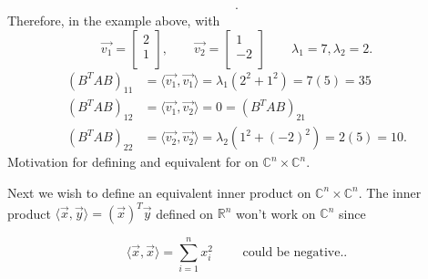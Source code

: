 \documentclass{report}
\begin{document}
{\begin{align*}
  .\end{align*}
  Therefore, in the example above, with 
  \[
  \vec{ v_1} = \begin{bmatrix}
   2\\
  1\\
  \end{bmatrix}
  , \qquad  \vec{ v_2} = \begin{bmatrix}
  1\\
  -2\\
  \end{bmatrix}
      \qquad  \lambda_1 = 7, \lambda_2 = 2
  .\] 
  \begin{align*}
   \left( B ^{T}A B \right) _{ 1 1} &= \langle \vec{ v_1} , \vec{ v_1}   \rangle = \lambda_1 \left( 2^2+1^2 \right)  = 7 \left( 5 \right) = 35\\
   \left( B ^{T}A B \right) _{ 1 2} &= \langle \vec{ v_1} , \vec{ v_2}   \rangle = 0 = \left( B^{T}A B \right) _{ 2 1}\\
   \left( B ^{T}A B \right) _{ 2 2} &= \langle \vec{ v_2} , \vec{ v_2}   \rangle = \lambda_2 \left( 1^2+(-2)^2 \right)  = 2 \left( 5 \right) = 10
  .\end{align*}
  Motivation for defining and equivalent for on $ \mathbb{C} ^{n} \times  \mathbb{C} ^{n}$.\\
 }
 





 
    Next we wish to define an equivalent inner product on $ \mathbb{C} ^{n} \times  \mathbb{C} ^{n}$. The inner product $ \langle \vec{ x}, \vec{ y}   \rangle = \left( \vec{ x}  \right) ^{T} \vec{ y} $  defined on $ \mathbb{R} ^{n}$ won't work on $ \mathbb{C} ^{n}$ since 
    
    \[
    \langle \vec{ x} , \vec{ x}   \rangle = \sum\limits_{i=1}^{n} x_i ^2 \qquad  \text{ could be negative.}
    .\] 
    
\end{document}
